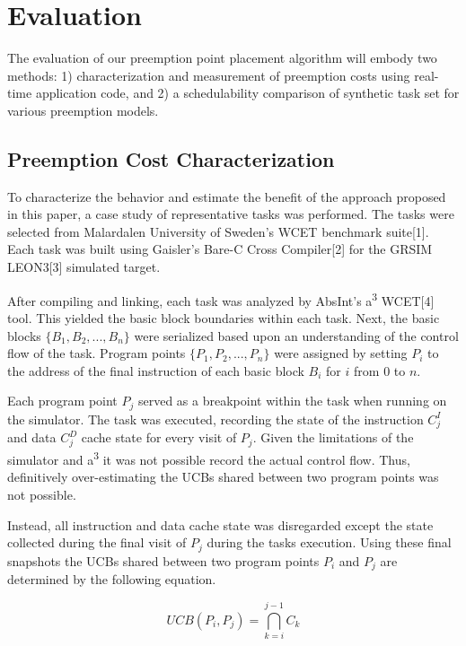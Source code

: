 \section{Evaluation}\label{sec:evaluation}

The evaluation of our preemption point placement algorithm will embody
two methods: 1) characterization and measurement of preemption costs
using real-time application code, and 2) a schedulability comparison
of synthetic task set for various preemption models. 

\subsection {Preemption Cost
  Characterization}\label{sec:preemption_cost_measurement} 
To characterize the behavior and estimate the benefit of the approach
proposed in this paper, a case study of representative tasks was
performed. The tasks were selected from Malardalen University of
Sweden's WCET benchmark suite[1]. Each task was built using Gaisler's
Bare-C Cross Compiler[2] for the GRSIM LEON3[3] simulated target. 

After compiling and linking, each task was analyzed by AbsInt's
a\textsuperscript{3} WCET[4] tool. This yielded the basic block
boundaries within each task. Next, the basic blocks
${\{B_1, B_2, ..., B_n\}}$ were serialized based upon an understanding of
the control flow of the task. Program points
${\{P_1, P_2, ..., P_n\}}$ were assigned by setting ${P_i}$ to the
address of the final instruction of each basic block ${B_i}$ for ${i}$
from ${0}$ to ${n}$.

Each program point ${P_j}$ served as a breakpoint within the task when
running on the simulator. The task was executed, recording the state of
the instruction ${C^I_j}$ and data ${C^D_j}$ cache state for every
visit of ${P_j}$. Given the limitations of the simulator and
a\textsuperscript{3} it was not possible record the actual control
flow. Thus, definitively over-estimating the UCBs shared between two
program points was not possible.

Instead, all instruction and data cache state was disregarded except
the state collected during the final visit of ${P_j}$ during the tasks
execution. Using these final snapshots the UCBs shared between two
program points ${P_i}$ and ${P_j}$ are determined by the following
equation. 
\begin{center}
  \begin{equation*}
    UCB(P_i, P_j) = \bigcap_{k=i}^{j-1} C_k
  \end{equation*}
\end{center}

